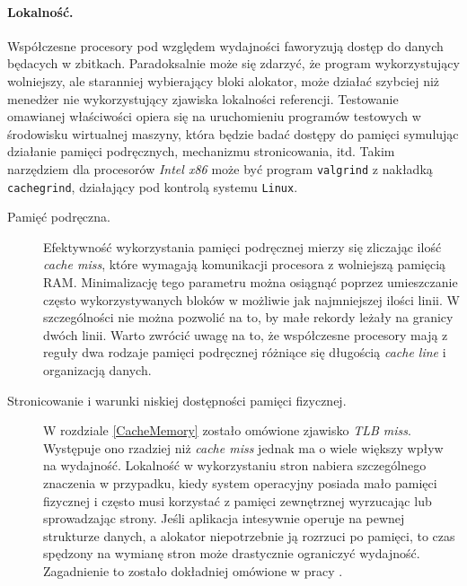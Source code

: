\documentclass[12pt,a4paper,titlepage,twoside]{mwart}
\begin{document}
\paragraph{Lokalność.} Współczesne procesory pod względem wydajności faworyzują
dostęp do danych będacych w zbitkach. Paradoksalnie może się zdarzyć, że
program wykorzystujący wolniejszy, ale staranniej wybierający bloki alokator,
może działać szybciej niż menedżer nie wykorzystujący zjawiska lokalności
referencji. Testowanie omawianej właściwości opiera się na uruchomieniu
programów testowych w środowisku wirtualnej maszyny, która będzie badać dostępy
do pamięci symulując działanie pamięci podręcznych, mechanizmu stronicowania,
itd. Takim narzędziem dla procesorów \textit{Intel x86} może być program
\texttt{valgrind} z nakładką \texttt{cachegrind}, działający pod kontrolą
systemu \texttt{Linux}. 

\begin{description}

\item[Pamięć podręczna.] Efektywność wykorzystania pamięci podręcznej mierzy
się zliczając ilość \textit{cache miss}, które wymagają komunikacji procesora z
wolniejszą pamięcią RAM. Minimalizację tego parametru można osiągnąć poprzez
umieszczanie często wykorzystywanych bloków w możliwie jak najmniejszej ilości
linii. W szczególności nie można pozwolić na to, by małe rekordy leżały na
granicy dwóch linii. Warto zwrócić uwagę na to, że współczesne procesory mają z
reguły dwa rodzaje pamięci podręcznej różniące się długością \textit{cache line} i
organizacją danych.

\vspace{1ex}

\item[Stronicowanie i warunki niskiej dostępności pamięci fizycznej.] W
rozdziale \ref{CacheMemory} zostało omówione zjawisko \textit{TLB miss}.
Występuje ono rzadziej niż \textit{cache miss} jednak ma o wiele większy wpływ
na wydajność. Lokalność w wykorzystaniu stron nabiera szczególnego znaczenia w
przypadku, kiedy system operacyjny posiada mało pamięci fizycznej i często musi
korzystać z pamięci zewnętrznej wyrzucając lub sprowadzając strony. Jeśli
aplikacja intesywnie operuje na pewnej strukturze danych, a alokator
niepotrzebnie ją rozrzuci po pamięci, to czas spędzony na wymianę stron może
drastycznie ograniczyć wydajność. Zagadnienie to zostało dokładniej omówione w
pracy \cite{feng05localityimproving}.

\end{description}
\end{document}
